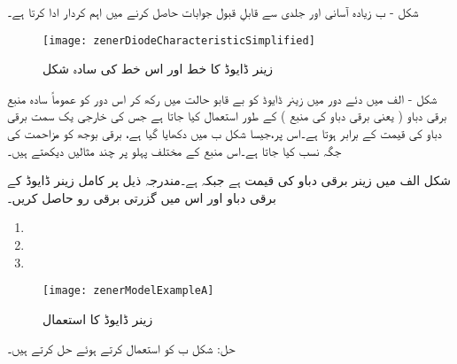 شکل  - ب زیادہ آسانی اور جلدی سے قابلِ قبول جوابات حاصل کرنے میں اہم کردار ادا کرتا ہے۔
\begin{figure}
\centering
\texttt{[image: zenerDiodeCharacteristicSimplified]}
\caption{زینر ڈایوڈ کا خط اور اس خط کی سادہ شکل }
\label{شکل_زینر_خط_کی_سادہ_شکل}
\end{figure}
شکل  - الف میں دئے دور میں زینر ڈایوڈ کو بے قابو حالت میں رکھ کر اس دور کو عموماً سادہ منبع برقی دباو ( یعنی برقی دباو کی منبع ) کے طور استعمال کیا جاتا ہے جس کی خارجی یک سمت برقی دباو کی قیمت   کے برابر ہوتا ہے۔اس پر،جیسا شکل   ب میں دکھایا گیا ہے، برقی بوجھ کو مزاحمت  کی جگہ نسب کیا جاتا ہے۔اس منبع کے مختلف پہلو پر چند مثالیں دیکھتے ہیں۔

 
شکل  الف میں زینر برقی دباو   کی قیمت  ہے جبکہ   ہے۔مندرجہ ذیل   پر کامل زینر ڈایوڈ کے برقی دباو اور اس میں گزرتی برقی رو حاصل کریں۔
\begin{enumerate}
\item
{}
\item
{}
\item
{}
\end{enumerate}
\begin{figure}
\centering
\texttt{[image: zenerModelExampleA]}
\caption{زینر ڈایوڈ کا استعمال}
\label{شکل_زینر_ڈایوڈ_کا_استعمال}
\end{figure}
حل:	شکل     ب کو استعمال کرتے ہوئے حل کرتے ہیں۔
